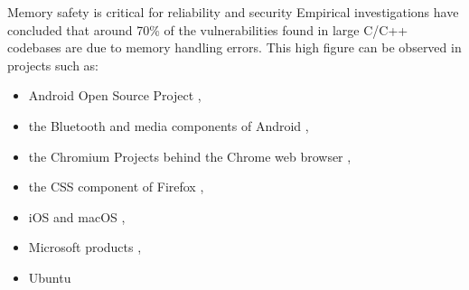 \documentclass{beamer}
\begin{document}
\begin{frame}{Memory safety is critical for reliability and security}
  Empirical investigations have concluded that around 70\% of the vulnerabilities found in
  large C/C++ codebases are due to memory handling errors. This high figure can be observed in
  projects such as:

  \begin{itemize}
    \item Android Open Source Project \cite{memory-bugs-android},
    \item the Bluetooth and media components of Android \cite{memory-bugs-android-media-bluetooth},
    \item the Chromium Projects behind the Chrome web browser \cite{memory-bugs-chrome},
    \item the CSS component of Firefox \cite{memory-bugs-firefox},
    \item iOS and macOS \cite{memory-bugs-ios-macos},
    \item Microsoft products \cite{miller-security-microsoft2019, memory-bugs-microsoft},
    \item Ubuntu \cite{memory-bugs-ubuntu}
  \end{itemize}
\end{frame}
\end{document}
